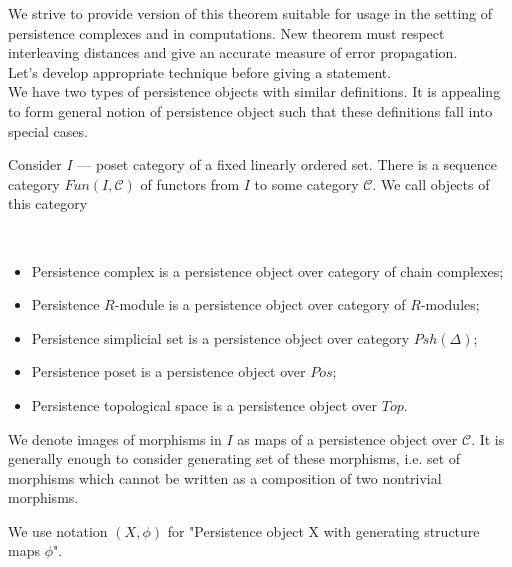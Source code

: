 We strive to provide version of this theorem suitable for usage in the setting of persistence complexes and in computations. New theorem must respect interleaving distances and give an accurate measure of error propagation.\\
Let's develop appropriate technique before giving a statement.\\

We have two types of persistence objects with similar definitions. It is appealing to form general notion of persistence object such that these definitions fall into special cases.\\

\begin{definition}
  Consider $I$ --- poset category of a fixed linearly ordered set. There is a sequence category $Fun(I, \mathcal{C})$ of functors from $I$ to some category $\mathcal{C}$. We call objects of this category 
\end{definition}

\begin{example} ~ \par
  \begin{itemize}
    \item Persistence complex is a persistence object over category of chain complexes;
    \item Persistence $R$-module is a persistence object over category of $R$-modules;
    \item Persistence simplicial set is a persistence object over category $Psh(\Delta)$;
    \item Persistence poset is a persistence object over $Pos$;
    \item Persistence topological space is a persistence object over $Top$.
  \end{itemize}
\end{example}

\begin{definition}
  We denote images of morphisms in $I$ as  maps of a persistence object over $\mathcal{C}$. It is generally enough to consider generating set of these morphisms, i.e. set of morphisms which cannot be written as a composition of two nontrivial morphisms.
\end{definition}

We use notation $(X,\phi)$ for "Persistence object X with generating structure maps $\phi$".\\

